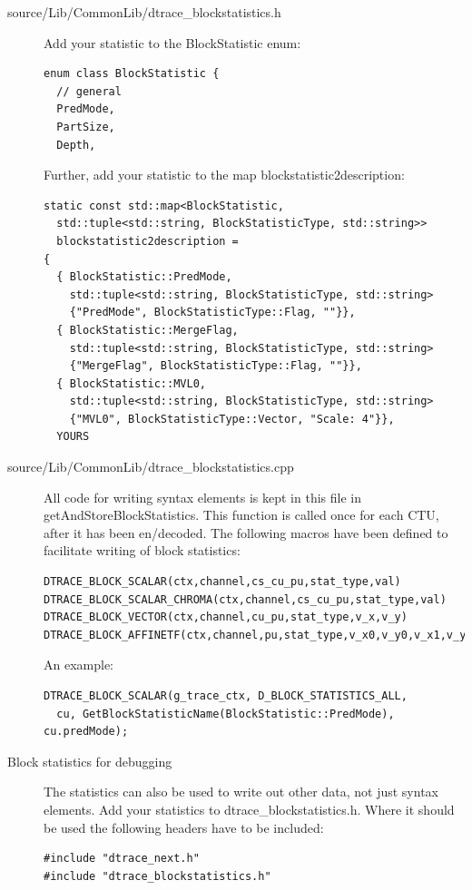 \documentclass[a4paper,11pt]{jvetdoc}
\begin{document}
\begin{description}
\item[source/Lib/CommonLib/dtrace_blockstatistics.h]
  Add your statistic to the BlockStatistic enum:	
\begin{verbatim}
enum class BlockStatistic {
  // general
  PredMode,
  PartSize,
  Depth,
\end{verbatim}
  
Further, add your statistic to the map blockstatistic2description:
\begin{verbatim}
static const std::map<BlockStatistic, 
  std::tuple<std::string, BlockStatisticType, std::string>> 
  blockstatistic2description =
{
  { BlockStatistic::PredMode, 
    std::tuple<std::string, BlockStatisticType, std::string>
    {"PredMode", BlockStatisticType::Flag, ""}},
  { BlockStatistic::MergeFlag,
    std::tuple<std::string, BlockStatisticType, std::string>
    {"MergeFlag", BlockStatisticType::Flag, ""}},
  { BlockStatistic::MVL0,
    std::tuple<std::string, BlockStatisticType, std::string>
    {"MVL0", BlockStatisticType::Vector, "Scale: 4"}},
  YOURS
\end{verbatim}


\item[source/Lib/CommonLib/dtrace_blockstatistics.cpp] All code for
  writing syntax elements is kept in this file in
  getAndStoreBlockStatistics. This function is called once for each
  CTU, after it has been en/decoded. The following macros have been
  defined to facilitate writing of block statistics:
\begin{verbatim}
DTRACE_BLOCK_SCALAR(ctx,channel,cs_cu_pu,stat_type,val)   
DTRACE_BLOCK_SCALAR_CHROMA(ctx,channel,cs_cu_pu,stat_type,val)
DTRACE_BLOCK_VECTOR(ctx,channel,cu_pu,stat_type,v_x,v_y)    
DTRACE_BLOCK_AFFINETF(ctx,channel,pu,stat_type,v_x0,v_y0,v_x1,v_y1,v_x2,v_y2) 
\end{verbatim}

An example:
\begin{verbatim}
DTRACE_BLOCK_SCALAR(g_trace_ctx, D_BLOCK_STATISTICS_ALL, 
  cu, GetBlockStatisticName(BlockStatistic::PredMode), cu.predMode);
\end{verbatim}


\item[Block statistics for debugging] The statistics can also be used
  to write out other data, not just syntax elements. Add your
  statistics to dtrace_blockstatistics.h. Where it should be used the
  following headers have to be included:
\begin{verbatim}
#include "dtrace_next.h"
#include "dtrace_blockstatistics.h"
\end{verbatim}
\end{description}
\end{document}
